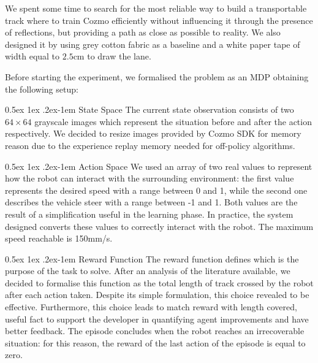 \documentclass[10pt,twocolumn,letterpaper]{article}
\makeatletter
\renewcommand{\paragraph}{%
  \@startsection{paragraph}{4}%
  {\z@}{0.5ex \@plus 1ex \@minus .2ex}{-1em}%
  {\normalfont\normalsize\bfseries}%
}
\makeatother
\begin{document}
We spent some time to search for the most reliable way to build a transportable track where to train Cozmo efficiently without influencing it through the presence of reflections, but providing a path as close as possible to reality.
We also designed it by using grey cotton fabric as a baseline and a white paper tape of width equal to $2.5$cm to draw the lane.

Before starting the experiment, we formalised the problem as an MDP obtaining the following setup:

\paragraph{State Space} The current state observation consists of two $64 \times 64$ grayscale images which represent the situation before and after the action respectively.
We decided to resize images provided by Cozmo SDK for memory reason due to the experience replay memory needed for off-policy algorithms.

\paragraph{Action Space} We used an array of two real values to represent how the robot can interact with the surrounding environment: the first value represents the desired speed with a range between 0 and 1, while the second one describes the vehicle steer with a range between -1 and 1.
Both values are the result of a simplification useful in the learning phase.
In practice, the system designed converts these values to correctly interact with the robot.
The maximum speed reachable is 150mm/s.

\paragraph{Reward Function} The reward function defines which is the purpose of the task to solve.
After an analysis of the literature available, we decided to formalise this function as the total length of track crossed by the robot after each action taken.
Despite its simple formulation, this choice revealed to be effective.
Furthermore, this choice leads to match reward with length covered, useful fact to support the developer in quantifying agent improvements and have better feedback.
The episode concludes when the robot reaches an irrecoverable situation: for this reason, the reward of the last action of the episode is equal to zero.
\end{document}
